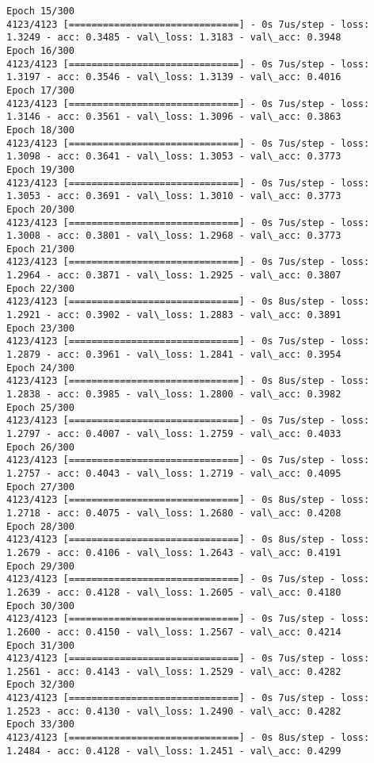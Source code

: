 \documentclass[11pt]{article}
\begin{document}
\begin{Verbatim}[commandchars=\\\{\}]
Epoch 15/300
4123/4123 [==============================] - 0s 7us/step - loss: 1.3249 - acc: 0.3485 - val\_loss: 1.3183 - val\_acc: 0.3948
Epoch 16/300
4123/4123 [==============================] - 0s 7us/step - loss: 1.3197 - acc: 0.3546 - val\_loss: 1.3139 - val\_acc: 0.4016
Epoch 17/300
4123/4123 [==============================] - 0s 7us/step - loss: 1.3146 - acc: 0.3561 - val\_loss: 1.3096 - val\_acc: 0.3863
Epoch 18/300
4123/4123 [==============================] - 0s 7us/step - loss: 1.3098 - acc: 0.3641 - val\_loss: 1.3053 - val\_acc: 0.3773
Epoch 19/300
4123/4123 [==============================] - 0s 7us/step - loss: 1.3053 - acc: 0.3691 - val\_loss: 1.3010 - val\_acc: 0.3773
Epoch 20/300
4123/4123 [==============================] - 0s 7us/step - loss: 1.3008 - acc: 0.3801 - val\_loss: 1.2968 - val\_acc: 0.3773
Epoch 21/300
4123/4123 [==============================] - 0s 7us/step - loss: 1.2964 - acc: 0.3871 - val\_loss: 1.2925 - val\_acc: 0.3807
Epoch 22/300
4123/4123 [==============================] - 0s 8us/step - loss: 1.2921 - acc: 0.3902 - val\_loss: 1.2883 - val\_acc: 0.3891
Epoch 23/300
4123/4123 [==============================] - 0s 7us/step - loss: 1.2879 - acc: 0.3961 - val\_loss: 1.2841 - val\_acc: 0.3954
Epoch 24/300
4123/4123 [==============================] - 0s 8us/step - loss: 1.2838 - acc: 0.3985 - val\_loss: 1.2800 - val\_acc: 0.3982
Epoch 25/300
4123/4123 [==============================] - 0s 7us/step - loss: 1.2797 - acc: 0.4007 - val\_loss: 1.2759 - val\_acc: 0.4033
Epoch 26/300
4123/4123 [==============================] - 0s 7us/step - loss: 1.2757 - acc: 0.4043 - val\_loss: 1.2719 - val\_acc: 0.4095
Epoch 27/300
4123/4123 [==============================] - 0s 8us/step - loss: 1.2718 - acc: 0.4075 - val\_loss: 1.2680 - val\_acc: 0.4208
Epoch 28/300
4123/4123 [==============================] - 0s 8us/step - loss: 1.2679 - acc: 0.4106 - val\_loss: 1.2643 - val\_acc: 0.4191
Epoch 29/300
4123/4123 [==============================] - 0s 7us/step - loss: 1.2639 - acc: 0.4128 - val\_loss: 1.2605 - val\_acc: 0.4180
Epoch 30/300
4123/4123 [==============================] - 0s 7us/step - loss: 1.2600 - acc: 0.4150 - val\_loss: 1.2567 - val\_acc: 0.4214
Epoch 31/300
4123/4123 [==============================] - 0s 7us/step - loss: 1.2561 - acc: 0.4143 - val\_loss: 1.2529 - val\_acc: 0.4282
Epoch 32/300
4123/4123 [==============================] - 0s 7us/step - loss: 1.2523 - acc: 0.4130 - val\_loss: 1.2490 - val\_acc: 0.4282
Epoch 33/300
4123/4123 [==============================] - 0s 8us/step - loss: 1.2484 - acc: 0.4128 - val\_loss: 1.2451 - val\_acc: 0.4299

\end{Verbatim}
\end{document}
